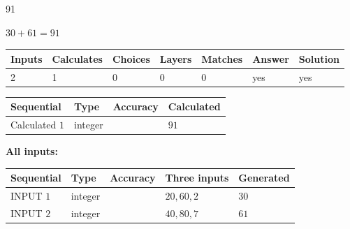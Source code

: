 \documentclass[12pt]{article}
\begin{document}
 

91
 
 
\noindent{}
 
 

 
 
 
\noindent{}
 
 

$ %
30 +  %
61=   %
91$
 
 
\noindent{}
 
 

 
   
   
   
   
\noindent\begin{tabular}{|l|l|l|l|l|l|l|}
 \hline
Inputs & Calculates & Choices & Layers & Matches & Answer & Solution \\ \hline
 2  & 
 1  & 
 0
  & 
 0  & 
 0  & 
  yes & 
  yes 
  \\ \hline
 \end{tabular}
   
   
   
   
\noindent{}
   
   
  
  
\noindent\begin{tabular}{|l|l|l|l|}
\hline
 Sequential & Type & Accuracy & Calculated \\ 
\hline
 
 
  Calculated $  1 $ & integer &  & 
  $ 91 $ 
 \\  \hline  
 \end{tabular}
   
   
   
   
\noindent\vspace{0.1in}\hspace{-0.08in} {\textbf{\Large{All inputs: }}}
   
   
  
  
\noindent\begin{tabular}{|l|l|l|l|l|}
\hline
 Sequential & Type & Accuracy & Three inputs & Generated \\ 
\hline
 
 
  INPUT $  1 $ & integer &  & $
 20
 , 
 60
 , 
 2
 $ & $ 30 $ 
 \\  \hline  
 
 
  INPUT $  2 $ & integer &  & $
 40
 , 
 80
 , 
 7
 $ & $ 61 $ 
 \\  \hline  
 \end{tabular}
   
\end{document}
